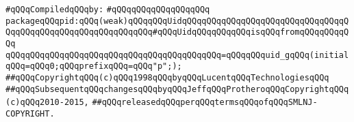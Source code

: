 \label{src/lib/c-kit/src/ast/pid.pkg}
\newline
\verb|#qQQqCompiledqQQqby:|\newline
\verb|#qQQqqQQqqQQqqQQqqQQq|\newline
\newline
\verb|packageqQQqpid:qQQq(weak)qQQqqQQqUidqQQqqQQqqQQqqQQqqQQqqQQqqQQqqQQqqQQqqQQqqQQqqQQqqQQqqQQqqQQqqQQq#qQQqUidqQQqqQQqqQQqisqQQqfromqQQqqQQqqQQq|\newline
\verb|qQQqqQQqqQQqqQQqqQQqqQQqqQQqqQQqqQQqqQQqqQQq=qQQqqQQquid_gqQQq(initialqQQq=qQQq0;qQQqprefixqQQq=qQQq"p";);|\newline
\newline
\newline
\newline
\newline
\verb|##qQQqCopyrightqQQq(c)qQQq1998qQQqbyqQQqLucentqQQqTechnologiesqQQq|\newline
\verb|##qQQqSubsequentqQQqchangesqQQqbyqQQqJeffqQQqProtheroqQQqCopyrightqQQq(c)qQQq2010-2015,|\newline
\verb|##qQQqreleasedqQQqperqQQqtermsqQQqofqQQqSMLNJ-COPYRIGHT.|\newline

